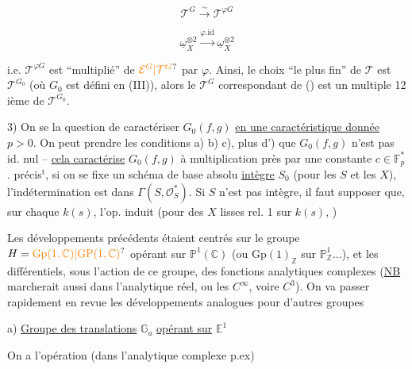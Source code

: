 \[
\mathcal T^G\xrightarrow{\sim}\mathcal T^{\varphi G}
\]


\[
\underline\omega_X^{\otimes2}\xrightarrow{\varphi.\mathrm{id}}\underline\omega_X^{\otimes2}
\]

i.e. $\mathcal T^{\varphi G}$ est ``multiplié'' de $\unsure{\mathcal E^G|\mathcal T^G}$ par $\varphi$. Ainsi, le choix ``le plus fin'' de $\mathcal T$ est $\mathcal T^{G_0}$ (où $G_0$ est défini en (III)), alors le $\mathcal T^G$ correspondant   de () est un multiple 12 ième de $\mathcal T^{G_0}$.

3) On  se   la question de caractériser $G_0(f,g)$ \uline{en une caractéristique donnée} $p>0$. On peut prendre les conditions a)  b) c), plus d') que $G_0(f,g)$ n'est pas id. nul -- \uline{cela caractérise} $G_0(f,g)$ à multiplication près par une constante $c\in\mathbb F_p^*$.  précis$^{\mathrm{t}}$, si on se fixe un schéma de base absolu \uline{intègre} $S_0$ (pour les $S$ et les $X$), l'indétermination est dans $\Gamma(S,\mathcal O_S^*)$. Si $S$ n'est pas intègre, il faut supposer que, sur chaque $k(s)$, l'op. induit (pour des $X$ lisses   rel. 1 sur $k(s)$, )




Les développements précédents étaient centrés sur le groupe $H=\unsure{\mathrm{Gp}(1,\mathbb C)|\mathrm{GP}(1,\mathbb C)}$ opérant sur $\mathbb P^1(\mathbb C)$ (ou $\mathrm{Gp}(1)_{\mathbb Z}$ sur $\mathbb P^1_{\mathbb Z}\ldots$), et les  différentiels, sous l'action de ce groupe, des fonctions analytiques complexes (\uline{NB} marcherait aussi dans l'analytique réel, ou les $C^\infty$, voire $C^3$). On va passer rapidement en revue les développements analogues pour d'autres groupes

a) \uline{Groupe des translations} $\mathbb G_a$ \uline{opérant sur} $\mathbb E^1$

On a l'opération (dans l'analytique complexe p.ex)

